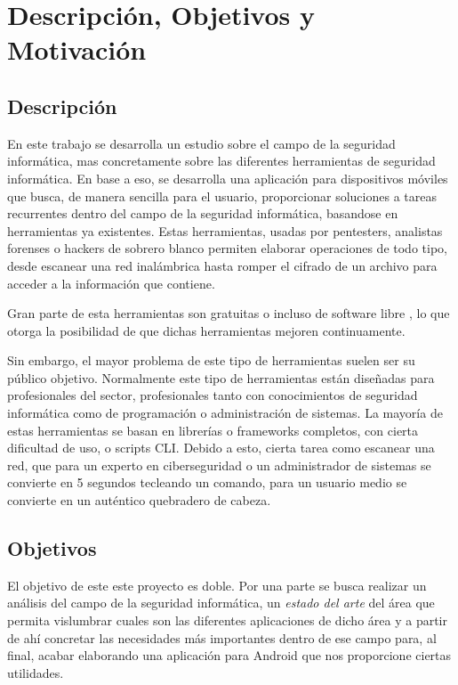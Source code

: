 \chapter{Descripción, Objetivos y Motivación}

\section{Descripción}

En este trabajo se desarrolla un estudio sobre el campo de la seguridad informática, mas concretamente sobre las diferentes herramientas de seguridad informática. En base a eso, se desarrolla una aplicación para dispositivos móviles que busca, de manera sencilla para el usuario, proporcionar soluciones a tareas recurrentes dentro del campo de la seguridad informática, basandose en herramientas ya existentes. Estas herramientas, usadas por pentesters, analistas forenses o hackers de sobrero blanco permiten elaborar operaciones de todo tipo, desde escanear una red inalámbrica hasta romper el cifrado de un archivo para acceder a la información que contiene.

Gran parte de esta herramientas son gratuitas \cite{ofi-seg-inter} o incluso de software libre \cite{github-sec-showcase}, lo que otorga la posibilidad de que dichas herramientas mejoren continuamente.

Sin embargo, el mayor problema de este tipo de herramientas suelen ser su público objetivo. Normalmente este tipo de herramientas están diseñadas para profesionales del sector, profesionales tanto con conocimientos de seguridad informática como de programación o administración de sistemas. La mayoría de estas herramientas se basan en librerías o frameworks completos, con cierta dificultad de uso, o scripts CLI. Debido a esto, cierta tarea como escanear una red, que para un experto en ciberseguridad o un administrador de sistemas se convierte en 5 segundos tecleando un comando, para un usuario medio se convierte en un auténtico quebradero de cabeza.

\section{Objetivos}

El objetivo de este este proyecto es doble. Por una parte se busca realizar un análisis del campo de la seguridad informática, un \textit{estado del arte} del área que permita vislumbrar cuales son las diferentes aplicaciones de dicho área y a partir de ahí concretar las necesidades más importantes dentro de ese campo para, al final, acabar elaborando una aplicación para Android que nos proporcione ciertas utilidades.

